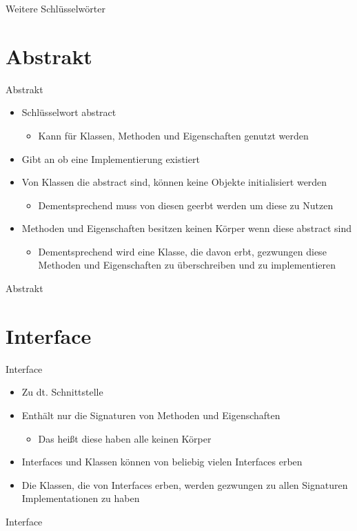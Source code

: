 \begin{frame}{Weitere Schlüsselwörter}
	
\end{frame}

\section{Abstrakt}
\begin{frame}{Abstrakt}
	\begin{itemize}
		\item Schlüsselwort \alert{abstract}
		\begin{itemize}
			\item Kann für Klassen, Methoden und Eigenschaften genutzt werden		
		\end{itemize}
		\item Gibt an ob eine Implementierung existiert
		\item Von Klassen die \alert{abstract} sind, können keine Objekte initialisiert werden
		\begin{itemize}
			\item Dementsprechend muss von diesen geerbt werden um diese zu Nutzen
		\end{itemize}
		\item Methoden und Eigenschaften besitzen keinen Körper wenn diese \alert{abstract} sind
		\begin{itemize}
			\item Dementsprechend wird eine Klasse, die davon erbt, gezwungen diese Methoden und Eigenschaften zu überschreiben und zu implementieren
		\end{itemize}
	\end{itemize}
\end{frame}

\begin{frame}{Abstrakt}
	
\end{frame}

\section{Interface}
\begin{frame}{Interface}
	\begin{itemize}
		\item Zu dt. Schnittstelle
		\item Enthält nur die \alert{Signaturen} von Methoden und Eigenschaften
		\begin{itemize}
			\item Das heißt diese haben alle keinen Körper
		\end{itemize}
		\item Interfaces und Klassen können von beliebig vielen Interfaces erben
		\item Die Klassen, die von Interfaces erben, werden gezwungen zu allen Signaturen Implementationen zu haben
	\end{itemize}
\end{frame}

\begin{frame}{Interface}
	
\end{frame}


